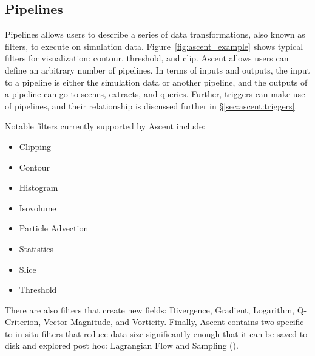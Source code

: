 \subsection{Pipelines}

Pipelines allows users to describe a series of data transformations, also known as filters,
to execute on simulation data.
%
Figure~\ref{fig:ascent_example} shows
typical filters for visualization: contour, threshold, and clip.
%
Ascent allows users can define an arbitrary number of pipelines.
%
In terms of inputs and outputs, the input to a pipeline is either
the simulation data or another pipeline, and the outputs of a pipeline
can go to scenes, extracts, and queries.
%
Further, triggers can make use of pipelines, and their relationship is discussed further
in \S\ref{sec:ascent:triggers}.

%


Notable filters currently supported by Ascent include:
\begin{multicols}{2}
\begin{itemize}
\item Clipping
\item Contour
\item Histogram
\item Isovolume
\item Particle Advection
\item Statistics
\item Slice
\item Threshold
\end{itemize}
\end{multicols}

There are also filters that create new fields: Divergence, Gradient, Logarithm, Q-Criterion, Vector Magnitude, and Vorticity.
%
Finally, Ascent contains two specific-to-in-situ filters that
reduce data size significantly enough that it can be saved to disk and explored post hoc:
Lagrangian Flow and Sampling ().


